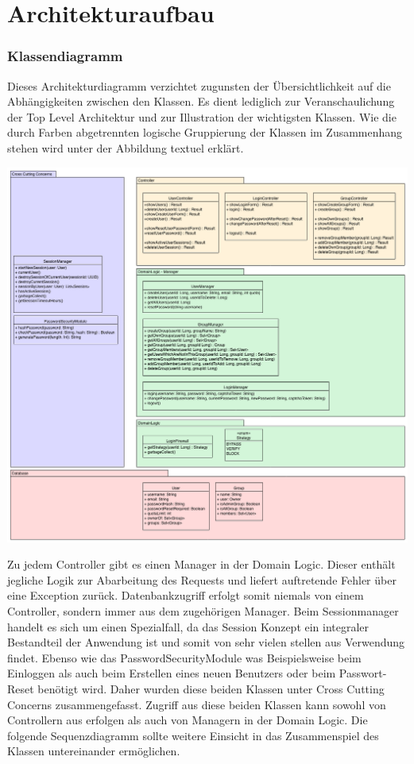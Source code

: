 \documentclass[12pt,DIV14,BCOR10mm,a4paper,twoside,parskip=half-,headsepline,headinclude,english,ngerman,bibliography=totocnumbered]{scrreprt}
\begin{document}
\tableofcontents  %

\chapter{Architekturaufbau}
\subsection{Klassendiagramm}
Dieses Architekturdiagramm verzichtet zugunsten der Übersichtlichkeit auf die Abhängigkeiten zwischen den Klassen. Es dient lediglich zur Veranschaulichung der Top Level Architektur und zur Illustration der wichtigsten Klassen. Wie die durch Farben abgetrennten logische Gruppierung der Klassen im Zusammenhang stehen wird unter der Abbildung textuel erklärt.

\includegraphics[width=0.73\paperwidth]{resources/class_diagram.png}

Zu jedem Controller gibt es einen Manager in der Domain Logic. Dieser enthält jegliche Logik zur Abarbeitung des Requests und liefert auftretende Fehler über eine Exception zurück. Datenbankzugriff erfolgt somit niemals von einem Controller, sondern immer aus dem zugehörigen Manager. Beim Sessionmanager handelt es sich um einen Spezialfall, da das Session Konzept ein integraler Bestandteil der Anwendung ist und somit von sehr vielen stellen aus Verwendung findet. Ebenso wie das PasswordSecurityModule was Beispielsweise beim Einloggen als auch beim Erstellen eines neuen Benutzers oder beim Passwort-Reset benötigt wird. Daher wurden diese beiden Klassen unter Cross Cutting Concerns zusammengefasst. Zugriff aus diese beiden Klassen kann sowohl von Controllern aus erfolgen als auch von Managern in der Domain Logic. Die folgende Sequenzdiagramm sollte weitere Einsicht in das Zusammenspiel des Klassen untereinander ermöglichen.
\end{document}
